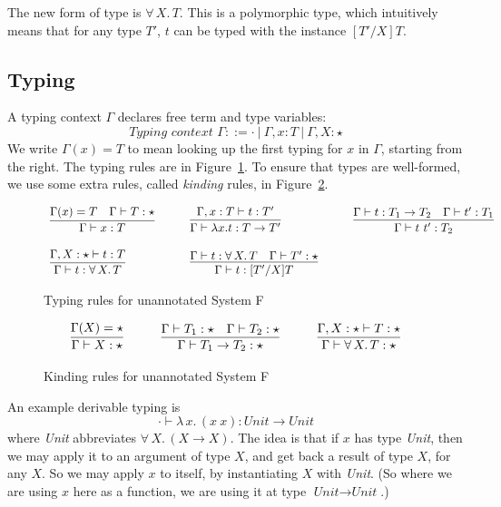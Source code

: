\documentclass{article}
\begin{document}
The new form of type is $\forall\, X.\,T$.  This is a polymorphic
type, which intuitively means that for any type $T'$, $t$ can be typed
with the instance $[T'/X]T$.  

\subsection{Typing}

A typing context $\Gamma$ declares free term and type variables:
\[
\textit{Typing context }\Gamma ::= \cdot\ |\ \Gamma, x:T\ |\ \Gamma, X : \star
\]
We write $\Gamma(x) = T$ to mean looking up the first typing for $x$ in $\Gamma$,
starting from the right.  The typing rules are in
Figure~\ref{fig:tp}.  To ensure that types are well-formed, we
use some extra rules, called \emph{kinding} rules, in Figure~\ref{fig:knd}.  

\begin{figure}
\[
\begin{array}{lllll}
\infer{\Gamma \vdash x : T}{\Gamma(x) = T & \Gamma \vdash T : \star} &\ \ \ &
\infer{\Gamma \vdash \lambda x . t : T \to T'}{\Gamma, x : T \vdash t : T'} &\ \ \ &
\infer{\Gamma \vdash t\ t' : T_2}{\Gamma \vdash t : T_1 \to T_2 & \Gamma \vdash t' : T_1} \\ \\
\infer{\Gamma \vdash t : \forall \,X.\,T}{\Gamma,X : \star \vdash t : T} &\ \ \ &
\infer{\Gamma \vdash t : [T'/X]T}{\Gamma \vdash t : \forall\, X.\,T & \Gamma \vdash T' : \star} &\ \ \ &\ 
\end{array}
\]
\caption{Typing rules for unannotated System F}
\label{fig:tp}
\end{figure}

\begin{figure}
\[
\begin{array}{lllll}
\infer{\Gamma \vdash X : \star}{\Gamma(X) = \star} &\ \ \ &
\infer{\Gamma \vdash T_1 \to T_2 : \star}{\Gamma \vdash T_1 : \star & \Gamma \vdash T_2 : \star} &\ \ \ &
\infer{\Gamma \vdash \forall\, X.\,T : \star}{\Gamma,X : \star \vdash T : \star}
\end{array}
\]
\caption{Kinding rules for unannotated System F}
\label{fig:knd}
\end{figure}

An example derivable typing is
\[
\cdot \vdash \lambda\,x.\,(x\ x) : \textit{Unit} \to \textit{Unit}
\]
\noindent where \textit{Unit} abbreviates $\forall\,X.\,(X \to X)$.  The
idea is that if $x$ has type \textit{Unit}, then we may apply it to an argument
of type $X$, and get back a result of type $X$, for any $X$.  So we may apply $x$
to itself, by instantiating $X$ with \textit{Unit}.  (So where we are using $x$ here
as a function, we are using it at type $\textit{Unit} \to \textit{Unit}$.)
\end{document}
